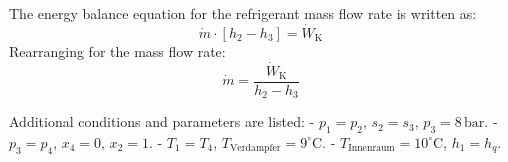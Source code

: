 The energy balance equation for the refrigerant mass flow rate is written as:  
\[
\dot{m} \cdot [h_2 - h_3] = \dot{W}_\text{K}
\]  
Rearranging for the mass flow rate:  
\[
\dot{m} = \frac{\dot{W}_\text{K}}{h_2 - h_3}
\]  

Additional conditions and parameters are listed:  
- \(p_1 = p_2\), \(s_2 = s_3\), \(p_3 = 8 \, \text{bar}\).  
- \(p_3 = p_4\), \(x_4 = 0\), \(x_2 = 1\).  
- \(T_1 = T_4\), \(T_\text{Verdampfer} = 9^\circ\text{C}\).  
- \(T_\text{Innenraum} = 10^\circ\text{C}\), \(h_1 = h_q\).